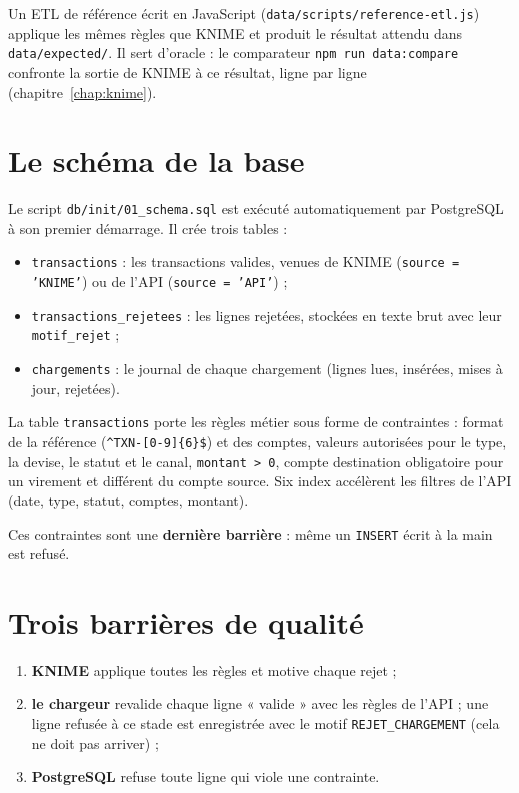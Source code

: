 Un ETL de référence écrit en JavaScript (\texttt{data/scripts/reference-etl.js}) applique les
mêmes règles que KNIME et produit le résultat attendu dans \texttt{data/expected/}. Il sert
d'oracle : le comparateur \texttt{npm run data:compare} confronte la sortie de KNIME à ce résultat,
ligne par ligne (chapitre~\ref{chap:knime}).

\section{Le schéma de la base}
Le script \texttt{db/init/01\_schema.sql} est exécuté automatiquement par PostgreSQL à son premier
démarrage. Il crée trois tables :
\begin{itemize}
  \item \texttt{transactions} : les transactions valides, venues de KNIME (\texttt{source = 'KNIME'}) ou de l'API (\texttt{source = 'API'}) ;
  \item \texttt{transactions\_rejetees} : les lignes rejetées, stockées en texte brut avec leur \texttt{motif\_rejet} ;
  \item \texttt{chargements} : le journal de chaque chargement (lignes lues, insérées, mises à jour, rejetées).
\end{itemize}


La table \texttt{transactions} porte les règles métier sous forme de contraintes : format de la
référence (\texttt{\^{}TXN-[0-9]\{6\}\$}) et des comptes, valeurs autorisées pour le type, la devise,
le statut et le canal, \texttt{montant > 0}, compte destination obligatoire pour un virement et
différent du compte source. Six index accélèrent les filtres de l'API (date, type, statut, comptes,
montant).

Ces contraintes sont une \textbf{dernière barrière} : même un \texttt{INSERT} écrit à la main est refusé.


\section{Trois barrières de qualité}
\begin{enumerate}
  \item \textbf{KNIME} applique toutes les règles et motive chaque rejet ;
  \item \textbf{le chargeur} revalide chaque ligne « valide » avec les règles de l'API ; une ligne
        refusée à ce stade est enregistrée avec le motif \texttt{REJET\_CHARGEMENT} (cela ne doit pas arriver) ;
  \item \textbf{PostgreSQL} refuse toute ligne qui viole une contrainte.
\end{enumerate}

